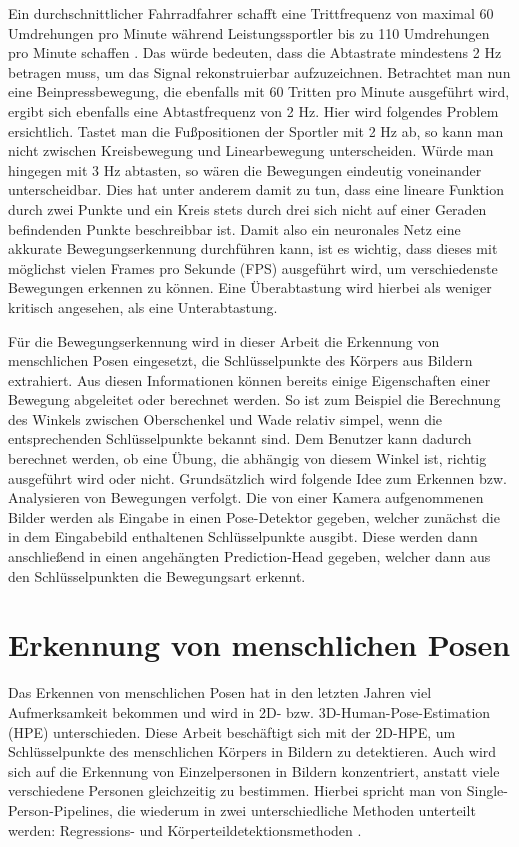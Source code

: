 Ein durchschnittlicher Fahrradfahrer schafft eine Trittfrequenz von maximal 60
Umdrehungen pro Minute während Leistungssportler bis zu 110 Umdrehungen pro
Minute schaffen \cite{smolik}. Das würde bedeuten, dass die Abtastrate
mindestens 2 Hz betragen muss, um das Signal rekonstruierbar aufzuzeichnen.
Betrachtet man nun eine Beinpressbewegung, die ebenfalls mit 60 Tritten pro
Minute ausgeführt wird, ergibt sich ebenfalls eine Abtastfrequenz von 2 Hz. Hier
wird folgendes Problem ersichtlich. Tastet man die Fußpositionen der Sportler
mit 2 Hz ab, so kann man nicht zwischen Kreisbewegung und Linearbewegung
unterscheiden. Würde man hingegen mit 3 Hz abtasten, so wären die Bewegungen
eindeutig voneinander unterscheidbar. Dies hat unter anderem damit zu tun, dass
eine lineare Funktion durch zwei Punkte und ein Kreis stets durch drei sich
nicht auf einer Geraden befindenden Punkte beschreibbar ist. Damit also ein
neuronales Netz eine akkurate Bewegungserkennung durchführen kann, ist es
wichtig, dass dieses mit möglichst vielen Frames pro Sekunde (FPS) ausgeführt
wird, um verschiedenste Bewegungen erkennen zu können. Eine Überabtastung wird
hierbei als weniger kritisch angesehen, als eine Unterabtastung.

Für die Bewegungserkennung wird in dieser Arbeit die Erkennung von menschlichen
Posen eingesetzt, die Schlüsselpunkte des Körpers aus Bildern extrahiert. Aus
diesen Informationen können bereits einige Eigenschaften einer 
Bewegung abgeleitet oder berechnet werden. So ist zum Beispiel die Berechnung
des Winkels zwischen Oberschenkel und Wade relativ simpel, wenn die
entsprechenden Schlüsselpunkte bekannt sind. Dem Benutzer kann dadurch
berechnet werden, ob eine Übung, die abhängig von diesem Winkel ist, richtig
ausgeführt wird oder nicht. Grundsätzlich wird folgende Idee zum Erkennen bzw.
Analysieren von Bewegungen verfolgt. Die von einer Kamera
aufgenommenen Bilder werden als Eingabe in einen Pose-Detektor gegeben, welcher
zunächst die in dem Eingabebild enthaltenen Schlüsselpunkte ausgibt.  Diese
werden dann anschließend in einen angehängten Prediction-Head gegeben, welcher
dann aus den Schlüsselpunkten die Bewegungsart erkennt.

\section{Erkennung von menschlichen Posen}
Das Erkennen von menschlichen Posen hat in den letzten Jahren viel
Aufmerksamkeit bekommen und wird in 2D- bzw. 3D-Human-Pose-Estimation (HPE)
unterschieden. Diese Arbeit beschäftigt sich mit der 2D-HPE, um Schlüsselpunkte
des menschlichen Körpers in Bildern zu detektieren. Auch wird sich auf die
Erkennung von Einzelpersonen in Bildern konzentriert, anstatt viele
verschiedene Personen gleichzeitig zu bestimmen. Hierbei spricht man von
Single-Person-Pipelines, die wiederum in zwei unterschiedliche Methoden
unterteilt werden: Regressions- und Körperteildetektionsmethoden
\cite{zheng2021deep}.

